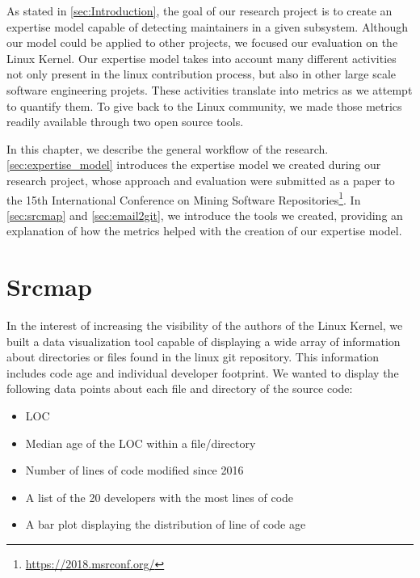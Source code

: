 \label{sec:Theme1}



As stated in \autoref{sec:Introduction}, the goal of our research project is to create an expertise model capable of detecting maintainers in a given subsystem. Although our model could be applied to other projects, we focused our evaluation on the Linux Kernel.
Our expertise model takes into account many different activities not only present in the linux contribution process, but also in other large scale software engineering projets. These activities translate into metrics as we attempt to quantify them. To give back to the Linux community, we made those metrics readily available through two open source tools.

In this chapter, we describe the general workflow of the research. \autoref{sec:expertise_model} introduces the expertise model we created during our research project, whose approach and evaluation were submitted as a paper to the 15th International Conference on Mining Software Repositories\footnote{\url{https://2018.msrconf.org/}}. In \autoref{sec:srcmap} and \autoref{sec:email2git}, we introduce the tools we created, providing an explanation of how the metrics helped with the creation of our expertise model. 





\section{Srcmap}
\label{sec:srcmap}

In the interest of increasing the visibility of the authors of the Linux Kernel, we built a data visualization tool capable of displaying a wide array of information about directories or files found in the linux git repository. This information includes code age and individual developer footprint. We wanted to display the following data points about each file and directory of the source code:

\begin{itemize}
	\item \ac{LOC}
	\item Median age of the \ac{LOC} within a file/directory
	\item Number of lines of code modified since 2016
	\item A list of the 20 developers with the most lines of code
	\item A bar plot displaying the distribution of line of code age
\end{itemize}

